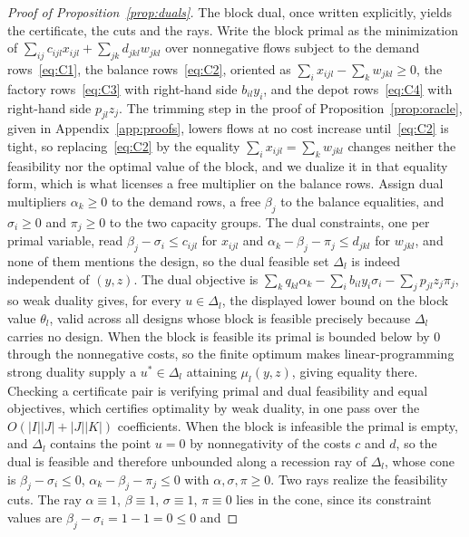 \begin{proof}[Proof of Proposition~\ref{prop:duals}]
The block dual, once written explicitly, yields the certificate, the
cuts and the rays. Write the block primal as the minimization
of
$\sum_{ij}c_{ijl}x_{ijl}+\sum_{jk}d_{jkl}w_{jkl}$ over nonnegative flows
subject to the demand rows~\eqref{eq:C1}, the balance
rows~\eqref{eq:C2}, oriented as $\sum_i x_{ijl}-\sum_k w_{jkl}\ge 0$,
the factory rows~\eqref{eq:C3} with right-hand side $b_{il}y_i$, and the
depot rows~\eqref{eq:C4} with right-hand side $p_{jl}z_j$. The trimming
step in the proof of Proposition~\ref{prop:oracle}, given in
Appendix~\ref{app:proofs}, lowers flows at no
cost increase until~\eqref{eq:C2} is tight, so replacing~\eqref{eq:C2}
by the equality $\sum_i x_{ijl}=\sum_k w_{jkl}$ changes neither the
feasibility nor the optimal value of the block, and we dualize it in
that equality form, which is what licenses a free multiplier on the
balance rows. Assign dual
multipliers $\alpha_k\ge 0$ to the demand rows, a free $\beta_j$ to the
balance equalities, and $\sigma_i\ge 0$ and
$\pi_j\ge 0$ to the two capacity groups. The dual constraints, one per primal
variable, read $\beta_j-\sigma_i\le c_{ijl}$ for $x_{ijl}$ and
$\alpha_k-\beta_j-\pi_j\le d_{jkl}$ for $w_{jkl}$, and none of them
mentions the design, so the dual feasible set $\Delta_l$ is indeed
independent of $(y,z)$. The dual objective is
$\sum_k q_{kl}\alpha_k-\sum_i b_{il}y_i\sigma_i-\sum_j p_{jl}z_j\pi_j$,
so weak duality gives, for every $u\in\Delta_l$, the displayed lower
bound on the block value $\theta_l$, valid across all designs whose block
is feasible precisely because $\Delta_l$ carries no design. When the block
is feasible its primal is bounded below by $0$ through the nonnegative
costs, so the finite optimum makes linear-programming strong duality
supply a $u^\ast\in\Delta_l$ attaining $\mu_l(y,z)$, giving equality
there. Checking a certificate pair is verifying primal and dual
feasibility and equal objectives, which certifies optimality by weak
duality, in one pass over the $O(|I||J|+|J||K|)$ coefficients. When
the block is infeasible the primal is empty, and $\Delta_l$ contains the
point $u=0$ by nonnegativity of the costs $c$ and $d$, so the dual is
feasible and therefore unbounded
along a recession ray of $\Delta_l$, whose cone is $\beta_j-\sigma_i\le
0$, $\alpha_k-\beta_j-\pi_j\le 0$ with $\alpha,\sigma,\pi\ge 0$. Two
rays realize the feasibility cuts. The ray $\alpha\equiv 1$, $\beta\equiv
1$, $\sigma\equiv 1$, $\pi\equiv 0$ lies in the cone, since its constraint
values are $\beta_j-\sigma_i=1-1=0\le 0$ and

\end{proof}
